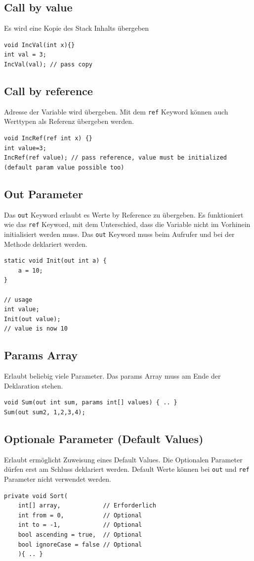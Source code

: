 \subsection{Call by value}
Es wird eine Kopie des Stack Inhalts übergeben
\begin{lstlisting}
void IncVal(int x){}
int val = 3; 
IncVal(val); // pass copy
\end{lstlisting}

\subsection{Call by reference}
Adresse der Variable wird übergeben. Mit dem \lstinline|ref| Keyword können auch Werttypen als Referenz übergeben werden.
\begin{lstlisting}
void IncRef(ref int x) {}
int value=3;
IncRef(ref value); // pass reference, value must be initialized (default param value possible too)
\end{lstlisting}

\subsection{Out Parameter}
Das \lstinline|out| Keyword erlaubt es Werte by Reference zu übergeben. Es funktioniert wie das \lstinline|ref| Keyword, mit dem Unterschied, dass die Variable nicht im Vorhinein initialisiert werden muss. Das \lstinline|out| Keyword muss beim Aufrufer und bei der Methode deklariert werden.
\begin{lstlisting}
static void Init(out int a) {
	a = 10;
}

// usage
int value;
Init(out value); 
// value is now 10 
\end{lstlisting}

\subsection{Params Array}
Erlaubt beliebig viele Parameter. Das params Array muss am Ende der Deklaration stehen.
\begin{lstlisting}
void Sum(out int sum, params int[] values) { .. }
Sum(out sum2, 1,2,3,4);
\end{lstlisting}

\subsection{Optionale Parameter (Default Values)}
Erlaubt ermöglicht Zuweisung eines Default Values. Die Optionalen Parameter dürfen erst am Schluss deklariert werden. Default Werte können bei \lstinline|out| und \lstinline|ref| Parameter nicht verwendet werden.
\begin{lstlisting}
private void Sort(
	int[] array,            // Erforderlich
	int from = 0,           // Optional
	int to = -1,            // Optional
	bool ascending = true,  // Optional
	bool ignoreCase = false // Optional
	){ .. }
\end{lstlisting}

